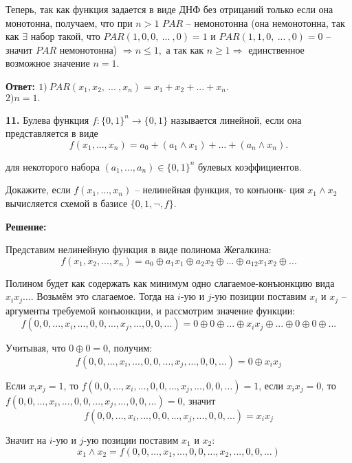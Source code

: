 \documentclass[a4paper,12pt]{article} %
\begin{document}
Теперь, так как функция задается в виде ДНФ без отрицаний только если она монотонна, получаем, что при $n > 1$ $PAR$ -- немонотонна (она немонотонна, так как $\exists$ набор такой, что $PAR(1,0,0,\ ...\ ,0) = 1$ и $PAR(1,1,0,\ ...\ ,0) = 0$ -- значит $PAR$ немонотонна) $\Rightarrow n \leqslant 1,$ а так как $n \geqslant 1 \Rightarrow$ единственное возможное значение $n = 1$. 

\begin{flushright}
\begin{large}
\textbf {Ответ: $1)\ PAR(x_1,x_2,\ ...\ ,x_n) = x_1 + x_2 + ... + x_n.$\\
$2) n = 1.$}
\end{large}
\end{flushright}

{\bf 11.} Булева функция $f : \{0, 1\}^n \rightarrow \{0, 1\}$ называется линейной, если она представляется в виде
\[ f(x_1,...,x_n) = a_0 + (a_1 \wedge x_1) + \dots +(a_n \wedge x_n). \]

для некоторого набора $(a_1, . . . , a_n) \in \{0, 1\}^n$ булевых коэффициентов.

Докажите, если $f(x_1, . . . , x_n)$ -- нелинейная функция, то конъюнк-
ция $x_1 \wedge x_2$ вычисляется схемой в базисе $\{0, 1, \neg, f\}$.
\begin{center}
\bfseries
{\Large Решение: }
\end{center}

Представим нелинейную функция в виде полинома Жегалкина: 
\[f(x_1,x_2,...,x_n) = a_0 \oplus a_1x_1 \oplus a_2x_2 \oplus ...\oplus a_{12}x_1x_2 \oplus...\]

Полином будет как содержать как минимум одно слагаемое-конъюнкцию вида $x_i x_j...$. Возьмём это слагаемое. Тогда на $i$-ую и $j$-ую позиции поставим $x_i$ и $x_j$ -- аргументы требуемой конъюнкции, и рассмотрим значение функции:
\[f(0,0,...,x_i,...,0,0,...,x_j,...,0,0,...) = 0 \oplus 0 \oplus ... \oplus x_ix_j \oplus ... \oplus 0 \oplus 0 \oplus ...\]

Учитывая, что $0 \oplus 0 = 0$, получим:
\[f(0,0,...,x_i,...,0,0,...,x_j,...,0,0,...) = 0 \oplus x_ix_j\]

Если $x_ix_j = 1$, то $f(0,0,...,x_i,...,0,0,...,x_j,...,0,0,...) = 1$, если $x_ix_j = 0$, то $f(0,0,...,x_i,...,0,0,...,x_j,...,0,0,...) = 0$, значит 
\[f(0,0,...,x_i,...,0,0,...,x_j,...,0,0,...) = x_ix_j\]

Значит на $i$-ую и $j$-ую позиции поставим $x_1$ и $x_2$:
\[x_1 \wedge x_2 = f(0,0,...,x_1,...,0,0,...,x_2,...,0,0,...)\]
\end{document}
